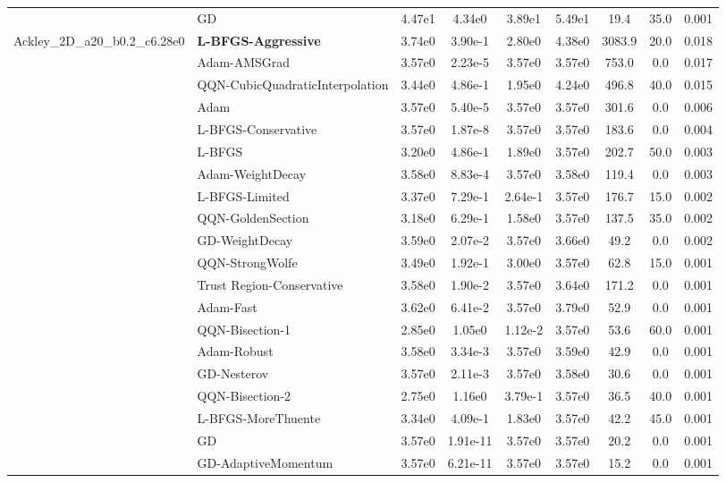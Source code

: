 \documentclass{article}
\begin{document}
\begin{longtable}{|l|l|c|c|c|c|c|c|c|}
\hline
 & GD & 4.47e1 & 4.34e0 & 3.89e1 & 5.49e1 & 19.4 & 35.0 & 0.001 \\
Ackley\_2D\_a20\_b0.2\_c6.28e0 & \textbf{L-BFGS-Aggressive} & 3.74e0 & 3.90e-1 & 2.80e0 & 4.38e0 & 3083.9 & 20.0 & 0.018 \\
\hline
 & Adam-AMSGrad & 3.57e0 & 2.23e-5 & 3.57e0 & 3.57e0 & 753.0 & 0.0 & 0.017 \\
\hline
 & QQN-CubicQuadraticInterpolation & 3.44e0 & 4.86e-1 & 1.95e0 & 4.24e0 & 496.8 & 40.0 & 0.015 \\
\hline
 & Adam & 3.57e0 & 5.40e-5 & 3.57e0 & 3.57e0 & 301.6 & 0.0 & 0.006 \\
\hline
 & L-BFGS-Conservative & 3.57e0 & 1.87e-8 & 3.57e0 & 3.57e0 & 183.6 & 0.0 & 0.004 \\
\hline
 & L-BFGS & 3.20e0 & 4.86e-1 & 1.89e0 & 3.57e0 & 202.7 & 50.0 & 0.003 \\
\hline
 & Adam-WeightDecay & 3.58e0 & 8.83e-4 & 3.57e0 & 3.58e0 & 119.4 & 0.0 & 0.003 \\
\hline
 & L-BFGS-Limited & 3.37e0 & 7.29e-1 & 2.64e-1 & 3.57e0 & 176.7 & 15.0 & 0.002 \\
\hline
 & QQN-GoldenSection & 3.18e0 & 6.29e-1 & 1.58e0 & 3.57e0 & 137.5 & 35.0 & 0.002 \\
\hline
 & GD-WeightDecay & 3.59e0 & 2.07e-2 & 3.57e0 & 3.66e0 & 49.2 & 0.0 & 0.002 \\
\hline
 & QQN-StrongWolfe & 3.49e0 & 1.92e-1 & 3.00e0 & 3.57e0 & 62.8 & 15.0 & 0.001 \\
\hline
 & Trust Region-Conservative & 3.58e0 & 1.90e-2 & 3.57e0 & 3.64e0 & 171.2 & 0.0 & 0.001 \\
\hline
 & Adam-Fast & 3.62e0 & 6.41e-2 & 3.57e0 & 3.79e0 & 52.9 & 0.0 & 0.001 \\
\hline
 & QQN-Bisection-1 & 2.85e0 & 1.05e0 & 1.12e-2 & 3.57e0 & 53.6 & 60.0 & 0.001 \\
\hline
 & Adam-Robust & 3.58e0 & 3.34e-3 & 3.57e0 & 3.59e0 & 42.9 & 0.0 & 0.001 \\
\hline
 & GD-Nesterov & 3.57e0 & 2.11e-3 & 3.57e0 & 3.58e0 & 30.6 & 0.0 & 0.001 \\
\hline
 & QQN-Bisection-2 & 2.75e0 & 1.16e0 & 3.79e-1 & 3.57e0 & 36.5 & 40.0 & 0.001 \\
\hline
 & L-BFGS-MoreThuente & 3.34e0 & 4.09e-1 & 1.83e0 & 3.57e0 & 42.2 & 45.0 & 0.001 \\
\hline
 & GD & 3.57e0 & 1.91e-11 & 3.57e0 & 3.57e0 & 20.2 & 0.0 & 0.001 \\
\hline
 & GD-AdaptiveMomentum & 3.57e0 & 6.21e-11 & 3.57e0 & 3.57e0 & 15.2 & 0.0 & 0.001 \\

\end{longtable}
\end{document}
